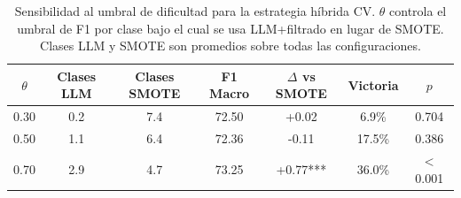 \begin{table}[htbp]
\centering
\small
\caption{Sensibilidad al umbral de dificultad para la estrategia híbrida CV. $\theta$ controla el umbral de F1 por clase bajo el cual se usa LLM+filtrado en lugar de SMOTE. Clases LLM y SMOTE son promedios sobre todas las configuraciones.}
\label{tab:hybrid_threshold}
\begin{tabular}{ccccccc}
\toprule
\textbf{$\theta$} & \textbf{Clases LLM} & \textbf{Clases SMOTE} & \textbf{F1 Macro} & \textbf{$\Delta$ vs SMOTE} & \textbf{Victoria} & \textbf{$p$} \\
\midrule
0.30 & 0.2 & 7.4 & 72.50 & +0.02 & 6.9\% & 0.704 \\
0.50 & 1.1 & 6.4 & 72.36 & -0.11 & 17.5\% & 0.386 \\
0.70 & 2.9 & 4.7 & 73.25 & +0.77*** & 36.0\% & $<$0.001 \\
\bottomrule
\end{tabular}
\end{table}